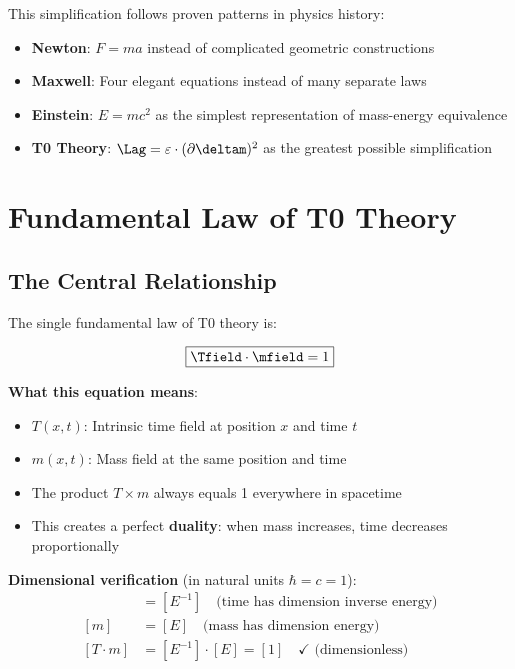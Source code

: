 	This simplification follows proven patterns in physics history:
	\begin{itemize}
		\item \textbf{Newton}: $F = ma$ instead of complicated geometric constructions
		\item \textbf{Maxwell}: Four elegant equations instead of many separate laws
		\item \textbf{Einstein}: $E = mc^2$ as the simplest representation of mass-energy equivalence
		\item \textbf{T0 Theory}: $\Lag = \varepsilon \cdot (\partial \deltam)^2$ as the greatest possible simplification
	\end{itemize}
	
	\section{Fundamental Law of T0 Theory}
	
	\subsection{The Central Relationship}
	
	The single fundamental law of T0 theory is:
	
	\begin{equation}
		\boxed{\Tfield \cdot \mfield = 1}
		\label{eq:fundamental_law}
	\end{equation}
	
	\textbf{What this equation means}:
	\begin{itemize}
		\item $T(x,t)$: Intrinsic time field at position $x$ and time $t$
		\item $m(x,t)$: Mass field at the same position and time
		\item The product $T \times m$ always equals 1 everywhere in spacetime
		\item This creates a perfect \textbf{duality}: when mass increases, time decreases proportionally
	\end{itemize}
	
	\textbf{Dimensional verification} (in natural units $\hbar = c = 1$):
	\begin{align}
		[T] &= [E^{-1}] \quad \text{(time has dimension inverse energy)} \\
		[m] &= [E] \quad \text{(mass has dimension energy)} \\
		[T \cdot m] &= [E^{-1}] \cdot [E] = [1] \quad \checkmark \text{ (dimensionless)}
	\end{align}
	
